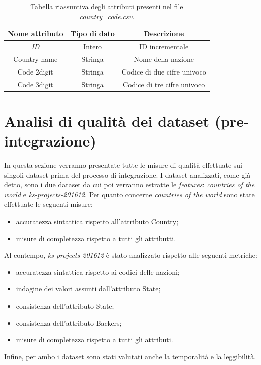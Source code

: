 \begin{table}
	\caption{Tabella riassuntiva degli attributi presenti nel file \textit{country\_code.csv}.}
	
	\label{tab:code}
	
	\centering
	\begin{tabular}{|c|c|c|}
		\hline
		\textbf{Nome attributo} & \textbf{Tipo di dato} & \textbf{Descrizione} \\ 
		\hline  
		\rule{0pt}{13pt}\emph{ID} & Intero & ID incrementale \\ 
		\hline  
		\rule{0pt}{13pt}Country name & Stringa & Nome della nazione \\ 
		\hline  
		\rule{0pt}{13pt}Code 2digit & Stringa & Codice di due cifre univoco \\ 
		\hline  
		\rule{0pt}{13pt}Code 3digit & Stringa & Codice di tre cifre univoco \\ 
		\hline   
	\end{tabular}
\end{table} 

\section{Analisi di qualità dei dataset (pre-integrazione)}
In questa sezione verranno presentate tutte le misure di qualità effettuate sui singoli dataset prima del processo di integrazione.
I dataset analizzati, come già detto, sono i due dataset da cui poi verranno estratte le \textit{features}: \textit{countries of the world} e \textit{ks-projects-201612}.
Per quanto concerne \textit{countries of the world} sono state effettuate le seguenti misure:
\begin{itemize}
	\item accuratezza sintattica rispetto all'attributo Country;
	\item misure di completezza rispetto a tutti gli attributti.
\end{itemize}
Al contempo, \textit{ks-projects-201612} è stato analizzato rispetto alle seguenti metriche:
\begin{itemize}
	\item accuratezza sintattica rispetto ai codici delle nazioni;
	\item indagine dei valori assunti dall'attributo State;
	\item consistenza dell'attributo State;
	\item consistenza dell'attributo Backers;
	\item misure di completezza rispetto a tutti gli attributi.
\end{itemize}
Infine, per ambo i dataset sono stati valutati anche la temporalità e la leggibilità.

